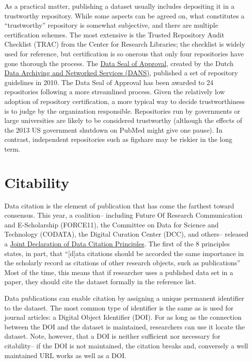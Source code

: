 \documentclass[10pt,twocolumn]{article}
\begin{document}
As a practical matter, publishing a dataset usually includes depositing it in a trustworthy repository.
While some aspects can be agreed on, what constitutes a ``trustworthy'' repository is somewhat subjective, and there are multiple certification schemes.
The most extensive is the Trusted Repository Audit Checklist (TRAC)\cite{dale_trustworthy_2007} from the Center for Research Libraries; the checklist is widely used for reference, but certification is so onerous that only four repositories have gone thorough the process.
The \href{http://datasealofapproval.org/}{Data Seal of Approval}, created by the Dutch \href{http://www.dans.knaw.nl/en}{Data Archiving and Networked Services (DANS)}, published a set of repository guidelines in 2010. 
The Data Seal of Approval has been awarded to 24 repositories following a more streamlined process.
Given the relatively low adoption of repository certification, a more typical way to decide trustworthiness is to judge by the organization responsible.
Repositories run by governments or large universities are likely to be considered trustworthy (although the effects of the 2013 US government shutdown on PubMed might give one pause).
In contrast, independent repositories such as figshare may be riskier in the long term. %

\section*{Citability}\label{citability}

Data citation is the element of publication that has come the farthest toward consensus.
This year, a coalition– including Future Of Research Communication and E-Scholarship (FORCE11)\cite{bourne_improving_2012}, the Committee on Data for Science and Technology (CODATA)\cite{codata-icsti_task_group_on_data_citation_standards_and_practices_out_2013}, the Digital Curation Center (DCC), and others– released a \href{http://www.force11.org/datacitation}{Joint Declaration of Data Citation Principles}.
The first of the 8 principles states, in part, that ``[d]ata citations should be accorded the same importance in the scholarly record as citations of other research objects, such as publications''
Most of the time, this means that if researcher uses a published data set in a paper, they should cite the dataset formally in the reference list.
	
Data publications can enable citation by assigning a unique permanent identifier to the dataset.
The most common type of identifier is the same as is used for journal articles: a Digital Object Identifier (DOI).
For as long as the connection between the DOI and the dataset is maintained, researchers can use it locate the dataset.
Note, however, that a DOI is neither sufficient nor necessary for citability-- if the DOI is not maintained, the citation breaks and, conversely a well maintained URL works as well as a DOI.
\end{document}
